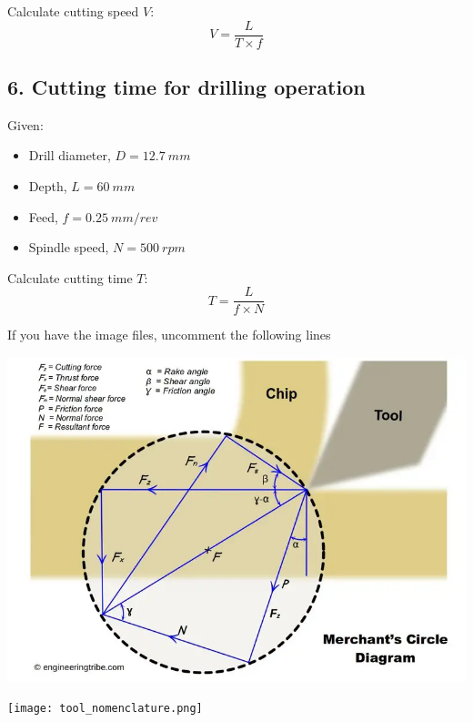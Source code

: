 \documentclass{article}
\begin{document}
Calculate cutting speed $V$:
\begin{equation}
    V = \frac{L}{T \times f}
\end{equation}

\subsection*{6. Cutting time for drilling operation}
Given:
\begin{itemize}
    \item Drill diameter, $D = \SI{12.7}{mm}$
    \item Depth, $L = \SI{60}{mm }$
    \item Feed, $f = \SI{0.25}{mm/rev}$
    \item Spindle speed, $N = \SI{500}{rpm}$
\end{itemize}

Calculate cutting time $T$:
\begin{equation}
    T = \frac{L}{f \times N}
\end{equation}

 If you have the image files, uncomment the following lines
 \begin{center}
     \includegraphics[width=\textwidth]{merchant_circle.png}
 \end{center}

 \begin{center}
     \texttt{[image: tool\_nomenclature.png]}
 \end{center}
\end{document}
